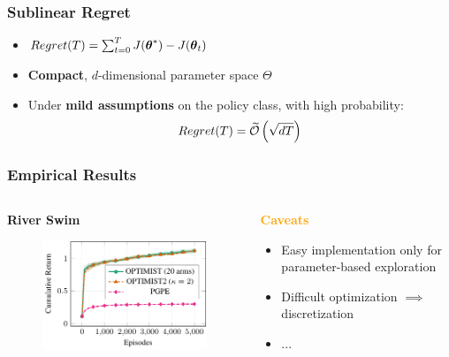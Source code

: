 \documentclass[aspectratio=169, table]{beamer}
\newcommand{\enb}[1]{\textcolor{poliblue1}{\textbf{#1}}}
\newcommand{\eno}[1]{\textcolor{orange}{\textbf{#1}}}
\begin{document}
\begin{frame} 
\frametitle{Sublinear Regret} 
\begin{itemize}
	\item $\mathop{Regret}(T) = \sum_{t=0}^T J(\boldsymbol{\theta}^*) - J(\boldsymbol{\theta}_t)$
	\vfill
	\item \enb{Compact}, $d$-dimensional parameter space $\Theta$
	\vfill
	\item Under \enb{mild assumptions} on the policy class, with high probability:
	\Large
	\begin{align*}
		\mathop{Regret}(T) = \widetilde{\mathcal{O}}\left(\sqrt{dT}\right)
	\end{align*}
	
\end{itemize}
\end{frame}

\begin{frame} 
\frametitle{Empirical Results} 
\begin{columns}
	\begin{column}{.5\textwidth}
		\centering
		{\bf River Swim}
		\begin{figure}
			\includegraphics[]{river.pdf}
		\end{figure}
	\end{column}
	\begin{column}{.5\textwidth}
		\eno{Caveats}
		\begin{itemize}
			\item Easy implementation only for parameter-based exploration
			\item Difficult optimization $\implies$ discretization
			\item ...
		\end{itemize}
	\end{column}
\end{columns}
\end{frame}
\end{document}
